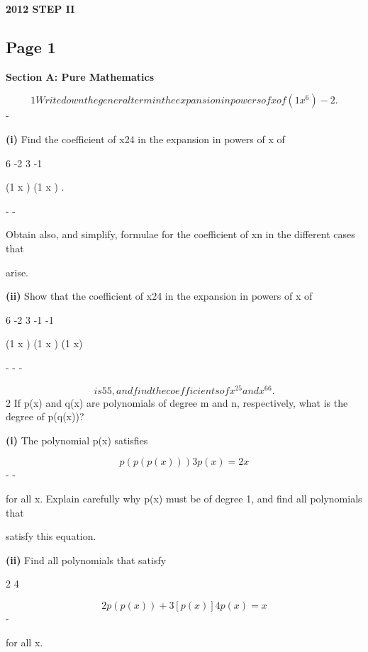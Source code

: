 \documentclass[12pt]{article}
\begin{document}
\begin{center}
{\Large \textbf{2012 STEP II}}
\end{center}

\subsection*{Page 1}
\begin{flushleft}
\phi\par
\bigskip\textbf{Section A: Pure Mathematics}\par
\[1 Write down the general term in the expansion in powers of x of (1 x^6) -2 .\]
-\par
\textbf{(i)} Find the coefficient of x24 in the expansion in powers of x of\par
6 -2 3 -1\par
(1 x ) (1 x ) .\par
- -\par
Obtain also, and simplify, formulae for the coefficient of xn in the different cases that\par
arise.\par
\textbf{(ii)} Show that the coefficient of x24 in the expansion in powers of x of\par
6 -2 3 -1 -1\par
(1 x ) (1 x ) (1 x)\par
- - -\par
\[is 55, and find the coefficients of x^25 and x^66.\]
2 If p(x) and q(x) are polynomials of degree m and n, respectively, what is the degree of p(q(x))?\par
\textbf{(i)} The polynomial p(x) satisfies\par
\[p(p(p(x))) 3p(x) = 2x\]
- -\par
for all x. Explain carefully why p(x) must be of degree 1, and find all polynomials that\par
satisfy this equation.\par
\textbf{(ii)} Find all polynomials that satisfy\par
2 4\par
\[2p(p(x)) + 3[p(x)] 4p(x) = x\]
-\par
for all x.\par
\end{flushleft}
\end{document}
